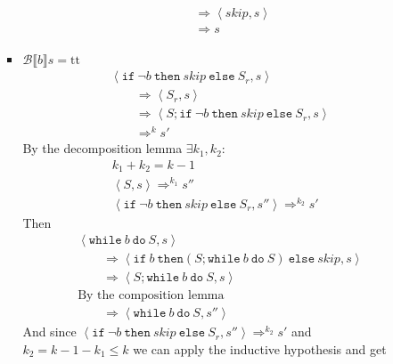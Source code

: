 \begin{exercise}
\begin{itemize}
\begin{itemize}
\begin{itemize}
\begin{gather*}
\begin{align*}
                            \\&\qquad\Rightarrow \left<skip, s\right>
                            \\&\qquad\Rightarrow s
                        \end{align*}
                    \end{gather*}
                    \item $\mathcal{B} \llbracket b \rrbracket s = \text{tt}$
                    \begin{align*}
                        &\left<\texttt{if}\ \neg b\ \texttt{then}\ skip\ \texttt{else}\ S_r, s\right>
                        \\&\qquad\Rightarrow \left<S_r, s\right>
                        \\&\qquad\Rightarrow \left<S; \texttt{if}\ \neg b\ \texttt{then}\ skip\ \texttt{else}\ S_r, s\right>
                        \\&\qquad\Rightarrow^k s'
                    \end{align*}
                    By the decomposition lemma $\exists k_1, k_2 :$
                    \begin{gather*}
                        k_1 + k_2 = k - 1 \\
                        \left<S, s\right> \Rightarrow^{k_1} s'' \\
                        \left<\texttt{if}\ \neg b\ \texttt{then}\ skip\ \texttt{else}\ S_r, s''\right> \Rightarrow^{k_2} s'
                    \end{gather*}
                    Then
                    \begin{align*}
                        &\left<\texttt{while}\ b\ \texttt{do}\ S, s\right>
                        \\&\qquad\Rightarrow \left<\texttt{if}\ b\ \texttt{then} (S; \texttt{while}\ b\ \texttt{do}\ S)\ \texttt{else}\ skip, s\right>
                        \\&\qquad\Rightarrow \left<S; \texttt{while}\ b\ \texttt{do}\ S, s\right>
                        \\&\text{By the composition lemma}
                        \\&\qquad\Rightarrow \left<\texttt{while}\ b\ \texttt{do}\ S, s''\right>
                    \end{align*}
                    And since $\left<\texttt{if}\ \neg b\ \texttt{then}\ skip\ \texttt{else}\ S_r, s''\right> \Rightarrow^{k_2} s'$ and $k_2 = k - 1 - k_1 \leq k$  we can apply the inductive hypothesis and get

\end{itemize}
\end{itemize}
\end{itemize}
\end{exercise}
